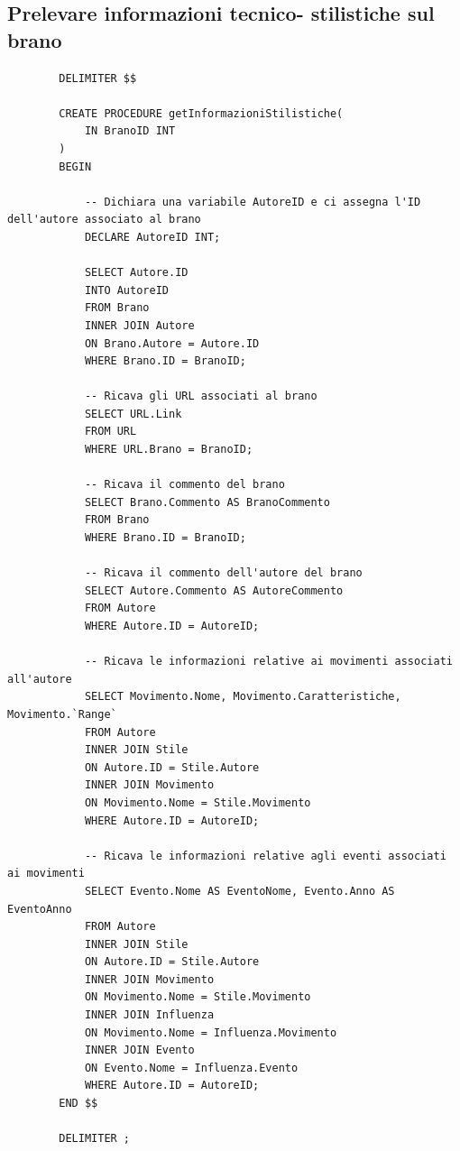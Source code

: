 \documentclass{article}
\begin{document}
    \subsection{Prelevare informazioni tecnico-
    stilistiche sul brano}
    
    \begin{verbatim}
        DELIMITER $$

        CREATE PROCEDURE getInformazioniStilistiche(
            IN BranoID INT
        )
        BEGIN

            -- Dichiara una variabile AutoreID e ci assegna l'ID dell'autore associato al brano
            DECLARE AutoreID INT;

            SELECT Autore.ID
            INTO AutoreID
            FROM Brano
            INNER JOIN Autore
            ON Brano.Autore = Autore.ID
            WHERE Brano.ID = BranoID;

            -- Ricava gli URL associati al brano
            SELECT URL.Link
            FROM URL
            WHERE URL.Brano = BranoID;

            -- Ricava il commento del brano
            SELECT Brano.Commento AS BranoCommento
            FROM Brano
            WHERE Brano.ID = BranoID;

            -- Ricava il commento dell'autore del brano
            SELECT Autore.Commento AS AutoreCommento
            FROM Autore
            WHERE Autore.ID = AutoreID;

            -- Ricava le informazioni relative ai movimenti associati all'autore
            SELECT Movimento.Nome, Movimento.Caratteristiche, Movimento.`Range`
            FROM Autore
            INNER JOIN Stile
            ON Autore.ID = Stile.Autore
            INNER JOIN Movimento
            ON Movimento.Nome = Stile.Movimento
            WHERE Autore.ID = AutoreID;

            -- Ricava le informazioni relative agli eventi associati ai movimenti
            SELECT Evento.Nome AS EventoNome, Evento.Anno AS EventoAnno
            FROM Autore
            INNER JOIN Stile
            ON Autore.ID = Stile.Autore
            INNER JOIN Movimento
            ON Movimento.Nome = Stile.Movimento
            INNER JOIN Influenza
            ON Movimento.Nome = Influenza.Movimento
            INNER JOIN Evento
            ON Evento.Nome = Influenza.Evento
            WHERE Autore.ID = AutoreID;
        END $$

        DELIMITER ;
    \end{verbatim}
    
\end{document}
